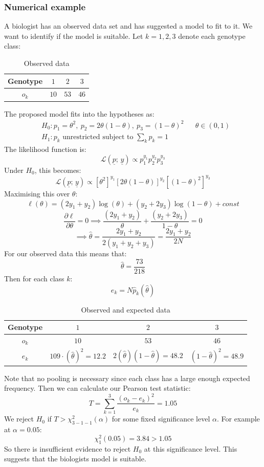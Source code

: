 \documentclass[12pt]{article}
\newcommand{\pf}[2]{\frac{\partial #1}{\partial #2}}
\begin{document}
\subsubsection{Numerical example}
A biologist has an observed data set and has suggested a model to fit to it. We want to identify if the model is suitable. Let \(k=1,2,3\) denote each genotype class:
\begin{table}[H]
    \centering
    \begin{tabular}{c|c c c}
        Genotype & \(1\) & \(2\) & \(3\) \\ \hline
        \(o_k\) & \(10\) & \(53\) & \(46\)
    \end{tabular}
    \caption{Observed data}
\end{table}
The proposed model fits into the hypotheses as:
\begin{align*}
    &H_0:p_1=\theta^2,\ p_2=2\theta(1-\theta),\ p_3=(1-\theta)^2 && \theta \in(0,1) \\
    &H_1:p_k\text{ unrestricted subject to }\sum_kp_k=1
\end{align*}
The likelihood function is:
\[\mathcal{L}(\underline{p};\, \underline{y})\propto p_1^{y_1}p_2^{y_{2}}p_3^{y_3}\]
Under \(H_0\), this becomes:
\[\mathcal{L}(\underline{p};\, \underline{y})\propto [\theta^2]^{y_1}[2\theta(1-\theta)]^{y_2}[(1-\theta)^2]^{y_3}\]
Maximising this over \(\theta\):
\[\ell(\theta)=(2y_1+y_2)\log(\theta)+(y_2+2y_3)\log(1-\theta)+const\]
\[\pf{\ell}{\theta}=0\implies \frac{(2y_1+y_2)}{\theta}+\frac{(y_2+2y_3)}{1-\theta}=0\]
\[\implies\hat{\theta}=\frac{2y_1+y_2}{2(y_1+y_2+y_3)}=\frac{2y_1+y_2}{2N}\]
For our observed data this means that:
\[\hat{\theta}=\frac{73}{218}\]
Then for each class \(k\):
\[e_k=N\hat{p}_k(\hat{\theta})\]
\begin{table}[H]
    \centering
    \begin{tabular}{c|c c c}
        Genotype & \(1\) & \(2\) & \(3\) \\ \hline
        \(o_k\) & \(10\) & \(53\) & \(46\) \\ 
        \(e_k\) & \(109\cdot(\hat{\theta})^2=12.2\) & \(2(\hat{\theta})(1-\hat{\theta})=48.2\) & \((1-\hat{\theta})^2=48.9\)
    \end{tabular}
    \caption{Observed and expected data}
\end{table}
Note that no pooling is necessary since each class has a large enough expected frequency. Then we can calculate our Pearson test statistic:
\[T=\sum^3_{k=1}\frac{(o_k-e_k)^2}{e_k}=1.05\]
We reject \(H_0\) if \(T>\chi^2_{3-1-1}(\alpha)\) for some fixed significance level \(\alpha\). For example at \(\alpha=0.05\):
\[\chi^2_{1}(0.05)=3.84>1.05\]
So there is insufficient evidence to reject \(H_0\) at this significance level. This suggests that the biologists model is suitable.
\clearpage
\end{document}
